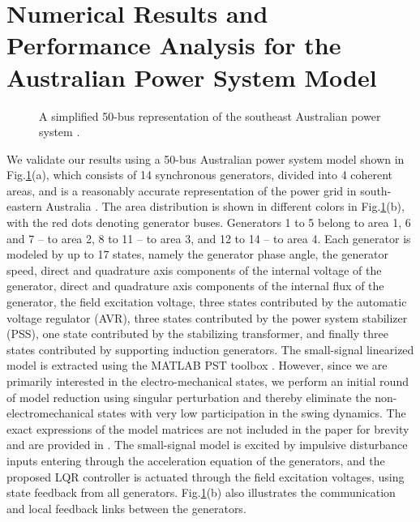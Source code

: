 \documentclass[12pt, draftclsnofoot,onecolumn]{IEEEtran}
\newcommand{\auswidth}{3.3in}
\newcommand{\auswidthb}{3.5in}
\newcommand{\auswidth}{4in}
\newcommand{\auswidthb}{4.5in}
\begin{document}
\section{Numerical Results and Performance Analysis for the Australian Power System Model}

\label{num:sec}

\begin{figure}[!t]
  	\centering
  	\caption{A simplified 50-bus representation of the southeast Australian power system \cite{Gibbard:2010aa}.}
  	\label{aus:fig}
  \end{figure}

We validate our results using a 50-bus Australian power system model shown in Fig.\ref{aus:fig}(a), which consists of 14 synchronous generators, divided into 4 coherent areas, and is a reasonably accurate representation of the power grid in south-eastern Australia \cite{Gibbard:2010aa}. The area distribution is shown in different colors in Fig.\ref{aus:fig}(b), with the red dots denoting generator buses. Generators 1 to 5 belong to area 1, 6 and 7 -- to area 2, 8 to 11 -- to area 3, and 12 to 14 -- to area 4. Each generator is modeled by up to 17 states, namely the generator phase angle, the generator speed, direct and quadrature axis components of the internal voltage of the generator, direct and quadrature axis components of the internal flux of the generator, the field excitation voltage, three states contributed by the automatic voltage regulator (AVR), three states contributed by the power system stabilizer (PSS), one state contributed by the stabilizing transformer, and finally three states contributed by supporting induction generators. The small-signal linearized model is extracted using the MATLAB PST toolbox \cite{Chow:1992aa}. However, since we are primarily interested in the electro-mechanical states, we perform an initial round of model reduction using singular perturbation and thereby eliminate the non-electromechanical states with very low participation in the swing dynamics. The exact expressions of the model matrices are not included in the paper for brevity and are provided in \cite{Lian:aa}. The small-signal model is excited by impulsive disturbance inputs entering through the acceleration equation of the generators, and the proposed LQR controller is actuated through the field excitation voltages, using state feedback from all generators. Fig.\ref{aus:fig}(b) also illustrates the communication and local feedback links between the generators. 
\end{document}
